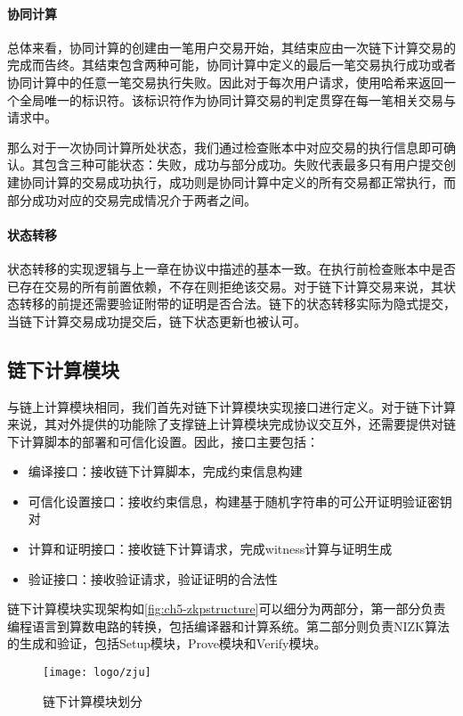 \paragraph{协同计算} 总体来看，协同计算的创建由一笔用户交易开始，其结束应由一次链下计算交易的完成而告终。其结束包含两种可能，协同计算中定义的最后一笔交易执行成功或者协同计算中的任意一笔交易执行失败。因此对于每次用户请求，使用哈希来返回一个全局唯一的标识符。该标识符作为协同计算交易的判定贯穿在每一笔相关交易与请求中。

那么对于一次协同计算所处状态，我们通过检查账本中对应交易的执行信息即可确认。其包含三种可能状态：失败，成功与部分成功。失败代表最多只有用户提交创建协同计算的交易成功执行，成功则是协同计算中定义的所有交易都正常执行，而部分成功对应的交易完成情况介于两者之间。

\paragraph{状态转移} 状态转移的实现逻辑与上一章在协议中描述的基本一致。在执行前检查账本中是否已存在交易的所有前置依赖，不存在则拒绝该交易。对于链下计算交易来说，其状态转移的前提还需要验证附带的证明是否合法。链下的状态转移实际为隐式提交，当链下计算交易成功提交后，链下状态更新也被认可。

\subsection{链下计算模块}%
与链上计算模块相同，我们首先对链下计算模块实现接口进行定义。对于链下计算来说，其对外提供的功能除了支撑链上计算模块完成协议交互外，还需要提供对链下计算脚本的部署和可信化设置。因此，接口主要包括：
\begin{itemize}
    \setlength{\itemsep}{0pt}
    \setlength{\parsep}{0pt}
    \setlength{\parskip}{0pt}
    \item 编译接口：接收链下计算脚本，完成约束信息构建
    \item 可信化设置接口：接收约束信息，构建基于随机字符串的可公开证明验证密钥对
    \item 计算和证明接口：接收链下计算请求，完成witness计算与证明生成
    \item 验证接口：接收验证请求，验证证明的合法性
\end{itemize}

链下计算模块实现架构如\autoref{fig:ch5-zkpstructure}可以细分为两部分，第一部分负责编程语言到算数电路的转换，包括编译器和计算系统。第二部分则负责NIZK算法的生成和验证，包括Setup模块，Prove模块和Verify模块。
\begin{figure}[htbp]
    \centering
    \texttt{[image: logo/zju]}
    \caption{\label{fig:ch5-zkpstructure}链下计算模块划分}
\end{figure}

